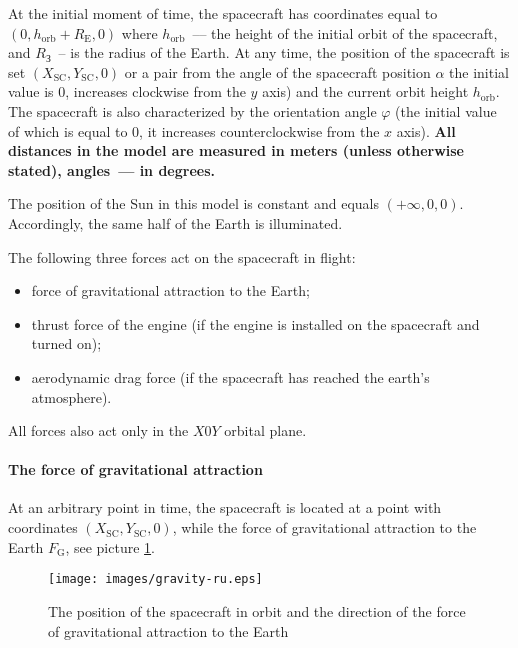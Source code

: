 \documentclass[12pt,a4paper]{article}
\begin{document}
At the initial moment of time, the spacecraft has coordinates equal to $(0, h_{\text{orb}} + R_{\text{E}},
0)$ where $h_{\text{orb}}$~--– the height of the initial orbit of the spacecraft, and $R_{\text{З}}$~-- is the radius of the Earth. At any time, the position of the spacecraft is set
$(X_{\text{SC}}, Y_{\text{SC}}, 0)$ or a pair from the angle of the spacecraft position $\alpha$ the initial value is 0, increases clockwise from the $y$ axis) and the current orbit height $h_{\text{orb}}$. The spacecraft is also characterized by the orientation angle $\varphi$ (the initial value of which is equal to 0, it increases counterclockwise from the $x$ axis). \textbf{All distances in the model are measured in meters (unless otherwise stated), angles~--- in degrees.}

The position of the Sun in this model is constant and equals $(+\infty, 0, 0)$. Accordingly, the same half of the Earth is illuminated.

The following three forces act on the spacecraft in flight:

\begin{itemize}
\item force of gravitational attraction to the Earth;
\item thrust force of the engine (if the engine is installed on the spacecraft and turned on);
\item aerodynamic drag force (if the spacecraft has reached the earth's atmosphere).
\end{itemize}

All forces also act only in the $X0Y$ orbital plane.

\paragraph{The force of gravitational attraction}

At an arbitrary point in time, the spacecraft is located at a point with coordinates $(X_{\text{SC}}, Y_{\text{SC}}, 0)$, while the force of gravitational attraction to the Earth $F_{\text {G}}$, see picture \ref{Pic:Gravity}.

\begin{figure}[tbh]
  \begin{center}
    \texttt{[image: images/gravity-ru.eps]}
    \caption{The position of the spacecraft in orbit and the direction of the force of gravitational attraction to the Earth}
    \label{Pic:Gravity}
  \end{center}
\end{figure}
\end{document}
